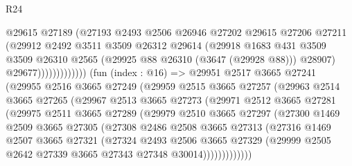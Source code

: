 \begin{lexlean}{R24}
\begin{coremodule}
                              @29615
                              @27189
                              (@27193
                                @2493
                                @2506
                                @26946
                                @27202
                                @29615
                                @27206
                                @27211
                                (@29912
                                  @2492
                                  @3511
                                  @3509
                                  @26312
                                  @29614
                                  (@29918
                                    @1683
                                    @431
                                    @3509
                                    @3509
                                    @26310
                                    @2565
                                    (@29925 @88 @26310 (@3647 (@29928 @88)))
                                    @28907)
                                  @29677)))))))))))))
        (fun (index : @16) =>
        @29951
          @2517
          @3665
          @27241
          (@29955
            @2516
            @3665
            @27249
            (@29959
              @2515
              @3665
              @27257
              (@29963
                @2514
                @3665
                @27265
                (@29967
                  @2513
                  @3665
                  @27273
                  (@29971
                    @2512
                    @3665
                    @27281
                    (@29975
                      @2511
                      @3665
                      @27289
                      (@29979
                        @2510
                        @3665
                        @27297
                        (@27300
                          @1469
                          @2509
                          @3665
                          @27305
                          (@27308
                            @2486
                            @2508
                            @3665
                            @27313
                            (@27316
                              @1469
                              @2507
                              @3665
                              @27321
                              (@27324
                                @2493
                                @2506
                                @3665
                                @27329
                                (@29999 @2505 @2642 @27339 @3665 @27343 @27348 @30014)))))))))))))

\end{coremodule}
\end{lexlean}
